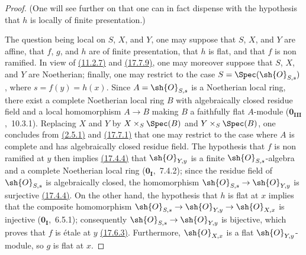 \begin{proof}
(One will see further on  that one can in fact dispense with the hypothesis that $h$ is locally of finite presentation.)

The question being local on $S$, $X$, and $Y$, one may suppose that $S$, $X$, and $Y$ are affine, that $f$, $g$, and $h$ are of finite presentation, that $h$ is flat, and that $f$ is non ramified.
In view of {\hyperlink{ega4.c04.cor.11-2-7}{(11.2.7)}} and {\hyperlink{ega4.c04.cor.17-7-9}{(17.7.9)}}, one may moreover suppose that $S$, $X$, and $Y$ are Noetherian; finally, one may restrict to the case $S=\Spec(\sh{O}_{S,s})$, where $s=f(y)=h(x)$.
Since $A=\sh{O}_{S,s}$ is a Noetherian local ring, there exist a complete Noetherian local ring $B$ with algebraically closed residue field and a local homomorphism $A\to B$ making $B$ a faithfully flat $A$-module ($\mathbf{0}_\mathbf{III}$,~10.3.1).
Replacing $X$ and $Y$ by $X\times_S\Spec(B)$ and $Y\times_S\Spec(B)$, one concludes from {\hyperlink{ega4.c04.prop.2-5-1}{(2.5.1)}} and {\hyperlink{ega4.c04.prop.17-7-1}{(17.7.1)}} that one may restrict to the case where $A$ is complete and has algebraically closed residue field.
The hypothesis that $f$ is non ramified at $y$ then implies {\hyperlink{ega4.c04.prop.17-4-4}{(17.4.4)}} that $\sh{O}_{Y,y}$ is a finite $\sh{O}_{S,s}$-algebra and a complete Noetherian local ring ($\mathbf{0}_\mathbf{I}$,~7.4.2); since the residue field of $\sh{O}_{S,s}$ is algebraically closed, the homomorphism $\sh{O}_{S,s}\to\sh{O}_{Y,y}$ is surjective {\hyperlink{ega4.c04.prop.17-4-4}{(17.4.4)}}.
On the other hand, the hypothesis that $h$ is flat at $x$ implies that the composite homomorphism $\sh{O}_{S,s}\to\sh{O}_{Y,y}\to\sh{O}_{X,x}$ is injective ($\mathbf{0}_\mathbf{I}$,~6.5.1); consequently $\sh{O}_{S,s}\to\sh{O}_{Y,y}$ is bijective, which proves that $f$ is \'etale at $y$ {\hyperlink{ega4.c04.prop.17-6-3}{(17.6.3)}}.
Furthermore, $\sh{O}_{X,x}$ is a flat $\sh{O}_{Y,y}$-module, so $g$ is flat at $x$.
\end{proof}


